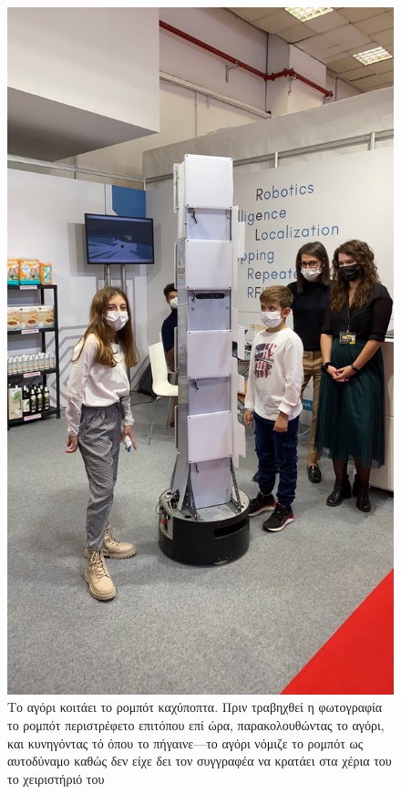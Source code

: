 \begin{figure}[H]\centering
\includegraphics[scale=0.25]{./figures/parts/appendix/chapters/06/beyond_2.jpg}
  \caption{\small Το αγόρι κοιτάει το ρομπότ καχύποπτα. Πριν τραβηχθεί η
           φωτογραφία το ρομπότ περιστρέφετο επιτόπου επί ώρα, παρακολουθώντας
           το αγόρι, και κυνηγόντας τό όπου το πήγαινε---το αγόρι νόμιζε το
           ρομπότ ως αυτοδύναμο καθώς δεν είχε δει τον συγγραφέα να κρατάει
           στα χέρια του το χειριστήριό του}
\end{figure}
